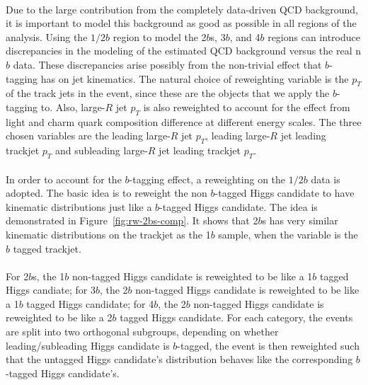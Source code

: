\paragraph{}
Due to the large contribution from the completely data-driven QCD background, it is important to model this background as good as possible in all regions of the analysis. Using the $1/2b$ region to model the 2$b$s, 3$b$, and 4$b$ regions can introduce discrepancies in the modeling of the estimated QCD background versus the real n$b$ data. These discrepancies arise possibly from the non-trivial effect that $b$-tagging has on jet kinematics. The natural choice of reweighting variable is the $p_{T}$ of the track jets in the event, since these are the objects that we apply the $b$-tagging to. Also, large-$R$ jet $p_{T}$ is also reweighted to account for the effect from light and charm quark composition difference at different energy scales. The three chosen variables are the leading large-$R$ jet $p_{T}$, leading large-$R$ jet leading trackjet $p_{T}$ and subleading large-$R$ jet leading trackjet $p_{T}$.

\paragraph{}
In order to account for the $b$-tagging effect, a reweighting on the $1/2b$ data is adopted. The basic idea is to reweight the non $b$-tagged Higgs candidate to have kinematic distributions just like a $b$-tagged Higgs candidate. The idea is demonstrated in Figure~\ref{fig:rw-2bs-comp}. It shows that 2$b$s has very similar kinematic distributions on the trackjet \pt as the 1$b$ sample, when the variable is the $b$ tagged trackjet. 

\paragraph{}
For 2$b$s, the 1$b$ non-tagged Higgs candidate is reweighted to be like a 1$b$ tagged Higgs candiate; for 3$b$, the 2$b$ non-tagged Higgs candidate is reweighted to be like a 1$b$ tagged Higgs candidate; for 4$b$, the 2$b$ non-tagged Higgs candidate is reweighted to be like a 2$b$ tagged Higgs candidate. For each category, the events are split into two orthogonal subgroups, depending on whether leading/subleading Higgs candidate is $b$-tagged, the event is then reweighted such that the untagged Higgs candidate's distribution behaves like the corresponding $b$-tagged Higgs candidate's.

